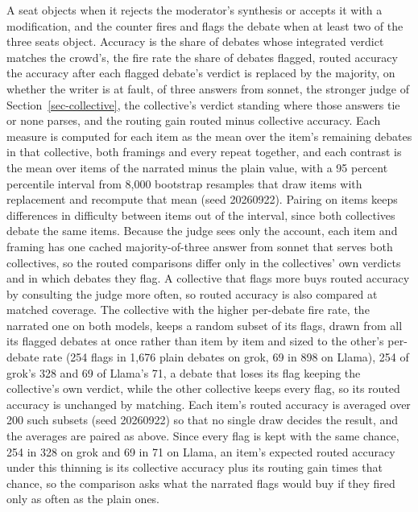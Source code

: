 A seat objects when it rejects the moderator's synthesis or accepts it with a
modification, and the counter fires and flags the debate when at least two
of the three seats object. Accuracy is the share of debates whose integrated
verdict matches the crowd's, the fire rate the share of debates flagged,
routed accuracy the accuracy after each flagged debate's verdict is replaced
by the majority, on whether the writer is at fault, of three answers from
sonnet, the stronger judge of Section~\ref{sec-collective}, the collective's
verdict standing where those answers tie or none parses, and the routing
gain routed minus collective accuracy.
Each measure is computed for each item as the mean over the item's remaining
debates in that collective, both framings and every repeat together, and
each contrast is the mean over items of the narrated minus the plain value,
with a 95 percent percentile interval from 8,000 bootstrap resamples that
draw items with replacement and recompute that mean (seed 20260922). Pairing
on items keeps differences in difficulty between items out of the interval,
since both collectives debate the same items.
Because the judge sees only the account, each item and framing has one cached
majority-of-three answer from sonnet that serves both collectives, so the
routed comparisons differ only in the collectives' own verdicts and in which
debates they flag.
A collective that flags more buys routed accuracy by consulting the judge
more often, so routed accuracy is also compared at matched coverage. The
collective with the higher per-debate fire rate, the narrated one on both
models, keeps a random subset of its flags, drawn from all its flagged
debates at once rather than item by item and sized to the other's per-debate
rate (254 flags in 1,676 plain debates on grok, 69 in 898 on Llama), 254 of
grok's 328 and 69 of Llama's 71, a debate that loses its flag
keeping the collective's own verdict, while the other collective keeps every
flag, so its routed accuracy is unchanged by matching. Each item's routed
accuracy is averaged over 200 such subsets (seed 20260922) so that no single draw decides
the result, and the averages are paired as above. Since every flag is kept
with the same chance, 254 in 328 on grok and 69 in 71 on Llama, an item's
expected routed accuracy under this thinning is its collective accuracy plus
its routing gain times that chance, so the comparison asks what the narrated
flags would buy if they fired only as often as the plain ones.

